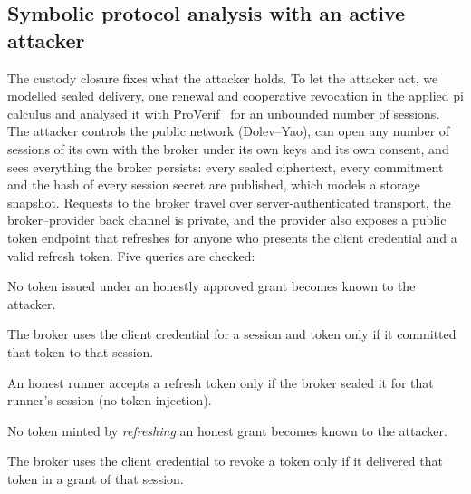 \documentclass[11pt]{article}
\begin{document}
\subsection{Symbolic protocol analysis with an active attacker}
\label{sec:proverif}
The custody closure fixes what the attacker holds. To let the attacker act, we modelled sealed delivery, one renewal and cooperative revocation in the applied pi calculus and analysed it with ProVerif~\cite{proverif} for an unbounded number of sessions. The attacker controls the public network (Dolev--Yao), can open any number of sessions of its own with the broker under its own keys and its own consent, and sees everything the broker persists: every sealed ciphertext, every commitment and the hash of every session secret are published, which models a storage snapshot. Requests to the broker travel over server-authenticated transport, the broker--provider back channel is private, and the provider also exposes a public token endpoint that refreshes for anyone who presents the client credential and a valid refresh token. Five queries are checked:
\begin{description}[leftmargin=2.2em,style=nextline,nosep]
\item[Q1] No token issued under an honestly approved grant becomes known to the attacker.
\item[Q2] The broker uses the client credential for a session and token only if it committed that token to that session.
\item[Q3] An honest runner accepts a refresh token only if the broker sealed it for that runner's session (no token injection).
\item[Q4] No token minted by \emph{refreshing} an honest grant becomes known to the attacker.
\item[Q5] The broker uses the client credential to revoke a token only if it delivered that token in a grant of that session.
\end{description}
\end{document}
